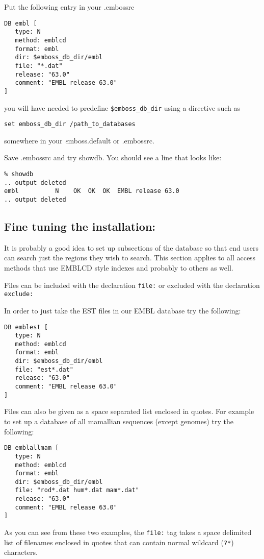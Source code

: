 \documentclass{report}
\newcommand{\ilcomm}[1]{{\tt #1}}
\newcommand{\filename}[1]{{\sf\textsl #1}}
\newcommand{\progname}[1]{{\sc #1}}
\begin{document}
Put the following entry in your \filename{.embossrc}
\begin{verbatim}
DB embl [
   type: N
   method: emblcd
   format: embl
   dir: $emboss_db_dir/embl
   file: "*.dat"
   release: "63.0"
   comment: "EMBL release 63.0"
]
\end{verbatim}
you will have needed to predefine \ilcomm{\$emboss\_db\_dir} using a directive such as 
\begin{verbatim}
set emboss_db_dir /path_to_databases
\end{verbatim} 
somewhere in your \filename{emboss.default} or \filename{.embossrc}.

Save \filename{.embossrc} and try \progname{showdb}. You should see a line that looks like:
\begin{verbatim}
% showdb
.. output deleted
embl          N    OK  OK  OK  EMBL release 63.0
.. output deleted
\end{verbatim}

\subsection{Fine tuning the installation:}
\label{sec:finetune}
It is probably a good idea to set up subsections of the database so that end users can search just the regions they wish to search. This section applies to all access methods that use EMBLCD style indexes and probably to others as well.

Files can be included with the declaration \ilcomm{file:} or excluded with the declaration \ilcomm{exclude:}

In order to just take the EST files in our EMBL database try the following:
\begin{verbatim}
DB emblest [
   type: N
   method: emblcd
   format: embl
   dir: $emboss_db_dir/embl
   file: "est*.dat"
   release: "63.0"
   comment: "EMBL release 63.0"
]
\end{verbatim}
Files can also be given as a space separated list enclosed in quotes. For example to set up a database of all mamallian sequences (except genomes) try the following:
\begin{verbatim}
DB emblallmam [
   type: N
   method: emblcd
   format: embl
   dir: $emboss_db_dir/embl
   file: "rod*.dat hum*.dat mam*.dat"
   release: "63.0"
   comment: "EMBL release 63.0"
]
\end{verbatim}
As you can see from these two examples, the \ilcomm{file:} tag takes a space delimited list of filenames enclosed in quotes that can contain normal wildcard (\ilcomm{?*}) characters.
\end{document}
